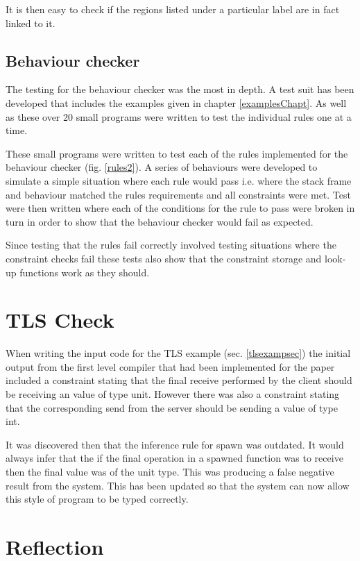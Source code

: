It is then easy to check if the regions listed under a particular label are in fact linked to it. 

\subsection{Behaviour checker}

The testing for the behaviour checker was the most in depth. A test suit has been developed that includes the examples given in chapter \ref{examplesChapt}. As well as these over 20 small programs were written to test the individual rules one at a time. 

These small programs were written to test each of the rules implemented for the behaviour checker (fig. \ref{rules2}). A series of behaviours were developed to simulate a simple situation where each rule would pass i.e. where the stack frame and behaviour matched the rules requirements and all constraints were met. Test were then written where each of the conditions for the rule to pass were broken in turn in order to show that the behaviour checker would fail as expected. 

Since testing that the rules fail correctly involved testing situations where the constraint checks fail these tests also show that the constraint storage and look-up functions work as they should.

\section{TLS Check}
\label{bug}

When writing the input code for the TLS example (sec. \ref{tlsexampsec}) the initial output from the first level compiler that had been implemented for the paper \cite{paper1} included a constraint stating that the final receive performed by the client should be receiving an value of type unit. However there was also a constraint stating that the corresponding send from the server should be sending a value of type int. 

It was discovered then that the inference rule for spawn was outdated. It would always infer that the if the final operation in a spawned function was to receive then the final value was of the unit type. This was producing a false negative result from the system. This has been updated so that the system can now allow this style of program to be typed correctly.

\section{Reflection}

